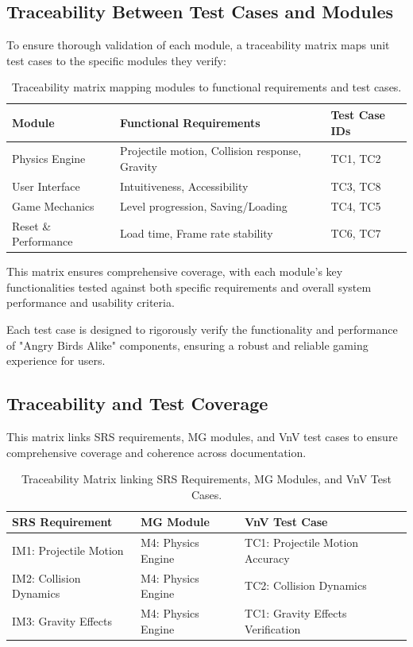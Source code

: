 \documentclass[12pt]{article}
\begin{document}
\subsection{Traceability Between Test Cases and Modules}

To ensure thorough validation of each module, a traceability matrix maps unit test cases to the specific modules they verify:

\begin{table}[H]
\centering
\begin{tabular}{|l|l|l|}
\hline
\textbf{Module} & \textbf{Functional Requirements} & \textbf{Test Case IDs} \\
\hline
Physics Engine & Projectile motion, Collision response, Gravity & TC1, TC2 \\\hline
User Interface & Intuitiveness, Accessibility & TC3, TC8 \\\hline
Game Mechanics & Level progression, Saving/Loading & TC4, TC5 \\\hline
Reset \& Performance & Load time, Frame rate stability & TC6, TC7 \\\hline
\hline
\end{tabular}
\caption{Traceability matrix mapping modules to functional requirements and test cases.}
\end{table}

This matrix ensures comprehensive coverage, with each module's key functionalities tested against both specific requirements and overall system performance and usability criteria.


Each test case is designed to rigorously verify the functionality and performance of "Angry Birds Alike" components, ensuring a robust and reliable gaming experience for users.

\subsection{Traceability and Test Coverage}
This matrix links SRS requirements, MG modules, and VnV test cases to ensure comprehensive coverage and coherence across documentation.


\begin{table}[H]
\centering
\begin{tabular}{|l|l|l|}
\hline
\textbf{SRS Requirement} & \textbf{MG Module} & \textbf{VnV Test Case} \\
\hline
IM1: Projectile Motion & M4: Physics Engine & TC1: Projectile Motion Accuracy \\
IM2: Collision Dynamics & M4: Physics Engine & TC2: Collision Dynamics \\
IM3: Gravity Effects & M4: Physics Engine & TC1: Gravity Effects Verification \\
\hline
\end{tabular}
\caption{Traceability Matrix linking SRS Requirements, MG Modules, and VnV Test Cases.}
\end{table}
\end{document}
